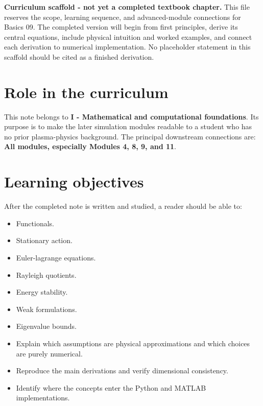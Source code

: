 \documentclass[11pt]{article}
\begin{document}

\begin{overviewbox}
\textbf{Curriculum scaffold - not yet a completed textbook chapter.} This file reserves the scope, learning sequence, and advanced-module connections for Basics 09. The completed version will begin from first principles, derive its central equations, include physical intuition and worked examples, and connect each derivation to numerical implementation. No placeholder statement in this scaffold should be cited as a finished derivation.
\end{overviewbox}

\ProjectTOC

\section{Role in the curriculum}
This note belongs to \textbf{I - Mathematical and computational foundations}. Its purpose is to make the later simulation modules readable to a student who has no prior plasma-physics background. The principal downstream connections are: \textbf{All modules, especially Modules 4, 8, 9, and 11}.

\section{Learning objectives}
After the completed note is written and studied, a reader should be able to:
\begin{itemize}[leftmargin=1.6em]
\item Functionals.
\item Stationary action.
\item Euler-lagrange equations.
\item Rayleigh quotients.
\item Energy stability.
\item Weak formulations.
\item Eigenvalue bounds.
\item Explain which assumptions are physical approximations and which choices are purely numerical.
\item Reproduce the main derivations and verify dimensional consistency.
\item Identify where the concepts enter the Python and MATLAB implementations.
\end{itemize}
\end{document}
